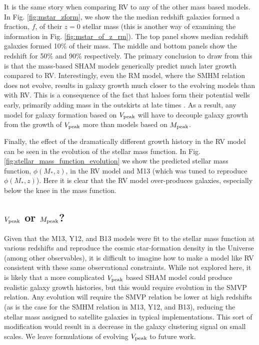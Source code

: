 \documentclass[a4paper,fleqn,usenatbib]{mnras}
\begin{document}
It is the same story when comparing RV to any of the other mass based models.  In Fig. \ref{fig:mstar_zform}, we show the the median redshift galaxies formed a fraction, $f$, of their $z=0$ stellar mass (this is another way of examining the information in Fig. \ref{fig:mstar_of_z_rm}).  The top panel shows median redshift galaxies formed 10\% of their mass.  The middle and bottom panels show the redshift for 50\% and 90\% respectively.  The primary conclusion to draw from this is that the mass-based SHAM models generically predict much later growth compared to RV.  Interestingly, even the RM model, where the SMHM relation does not evolve, results in galaxy growth much closer to the evolving models than with RV.  This is a consequence of the fact that haloes form their potential wells early, primarily adding mass in the outskirts at late times \citep{Bosch:2014cu}.  As a result, any model for galaxy formation based on $V_{\rm peak}$ will have to decouple galaxy growth from the growth of $V_{\rm peak}$ more than models based on $M_{\rm peak}$.        

Finally, the effect of the dramatically different growth history in the RV model can be seen in the evolution of the stellar mass function.  In Fig. \ref{fig:stellar_mass_function_evolution} we show the predicted stellar mass function, $\phi(M_*,z)$, in the RV model and M13 (which was tuned to reproduce $\phi(M_*,z)$).  Here it is clear that the RV model over-produces galaxies, especially below the knee in the mass function.


\subsection{$V_{\rm peak}$ or $M_{\rm peak}$?}

Given that the M13, Y12, and B13 models were fit to the stellar mass function at various redshifts and reproduce the cosmic star-formation density in the Universe (among other observables), it is difficult to imagine how to make a model like RV consistent with these same observational constraints.  While not explored here, it is likely that a more complicated $V_{\rm peak}$ based SHAM model could produce realistic galaxy growth histories, but this would require evolution in the SMVP relation.  Any evolution will require the SMVP relation be lower at high redshifts (as is the case for the SMHM relation in M13, Y12, and B13), reducing the stellar mass assigned to satellite galaxies in typical implementations.  This sort of modification would result in a decrease in the galaxy clustering signal on small scales.  We leave formulations of evolving $V_{\rm peak}$ to future work.    
\end{document}
